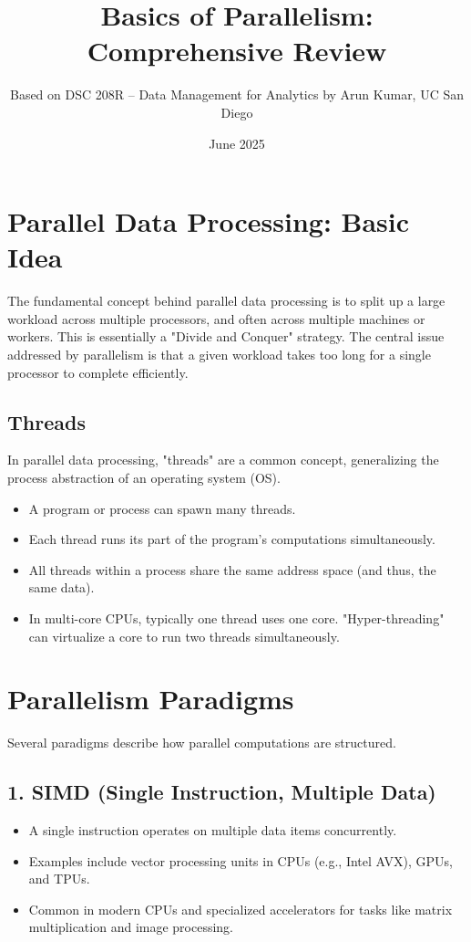 \documentclass{article}
\title{Basics of Parallelism: Comprehensive Review}
\author{Based on DSC 208R – Data Management for Analytics by Arun Kumar, UC San Diego}
\date{June 2025}
\begin{document}
\maketitle

\section*{Parallel Data Processing: Basic Idea}
The fundamental concept behind parallel data processing is to split up a large workload across multiple processors, and often across multiple machines or workers. This is essentially a "Divide and Conquer" strategy. The central issue addressed by parallelism is that a given workload takes too long for a single processor to complete efficiently.

\subsection*{Threads}
In parallel data processing, "threads" are a common concept, generalizing the process abstraction of an operating system (OS).
\begin{itemize}
    \item A program or process can spawn many threads.
    \item Each thread runs its part of the program's computations simultaneously.
    \item All threads within a process share the same address space (and thus, the same data).
    \item In multi-core CPUs, typically one thread uses one core. "Hyper-threading" can virtualize a core to run two threads simultaneously.
\end{itemize}

\section*{Parallelism Paradigms}
Several paradigms describe how parallel computations are structured.

\subsection*{1. SIMD (Single Instruction, Multiple Data)}
\begin{itemize}
    \item A single instruction operates on multiple data items concurrently.
    \item Examples include vector processing units in CPUs (e.g., Intel AVX), GPUs, and TPUs.
    \item Common in modern CPUs and specialized accelerators for tasks like matrix multiplication and image processing.
\end{itemize}
\end{document}
